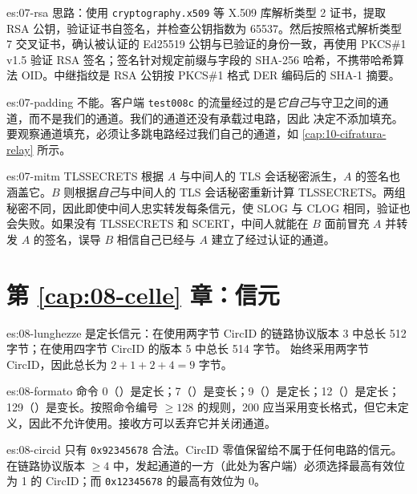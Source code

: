 \begin{soluzione}{es:07-rsa}
思路：使用 \texttt{cryptography.x509} 等 X.509 库解析类型 2 证书，提取 RSA 公钥，验证证书自签名，并检查公钥指数为 65537。然后按照格式解析类型 7 交叉证书，确认被认证的 Ed25519 公钥与已验证的身份一致，再使用 PKCS\#1 v1.5 验证 RSA 签名；签名针对规定前缀与字段的 SHA-256 哈希，不携带哈希算法 OID。中继指纹是 RSA 公钥按 PKCS\#1 格式 DER 编码后的 SHA-1 摘要。
\end{soluzione}

\begin{soluzione}{es:07-padding}
不能。客户端 \texttt{test008c} 的流量经过的是\emph{它自己}与守卫之间的通道，而不是我们的通道。我们的通道还没有承载过电路，因此  决定不添加填充。要观察通道填充，必须让多跳电路经过我们自己的通道，如 \cref{cap:10-cifratura-relay} 所示。
\end{soluzione}

\begin{soluzione}{es:07-mitm}
TLSSECRETS 根据 $A$ 与中间人的 TLS 会话秘密派生，$A$ 的签名也涵盖它。$B$ 则根据\emph{自己}与中间人的 TLS 会话秘密重新计算 TLSSECRETS。两组秘密不同，因此即使中间人忠实转发每条信元，使 SLOG 与 CLOG 相同，验证也会失败。如果没有 TLSSECRETS 和 SCERT，中间人就能在 $B$ 面前冒充 $A$ 并转发 $A$ 的签名，误导 $B$ 相信自己已经与 $A$ 建立了经过认证的通道。
\end{soluzione}

\section*{第 \ref{cap:08-celle} 章：信元}

\begin{soluzione}{es:08-lunghezze}
 是定长信元：在使用两字节 CircID 的链路协议版本 3 中总长 512 字节；在使用四字节 CircID 的版本 5 中总长 514 字节。 始终采用两字节 CircID，因此总长为 $2+1+2+4=9$ 字节。
\end{soluzione}

\begin{soluzione}{es:08-formato}
命令 0（）是定长；7（）是变长；9（）是定长；12（）是定长；129（）是变长。按照命令编号 $\ge 128$ 的规则，200 应当采用变长格式，但它未定义，因此不允许使用。接收方可以丢弃它并关闭通道。
\end{soluzione}

\begin{soluzione}{es:08-circid}
只有 \texttt{0x92345678} 合法。CircID 零值保留给不属于任何电路的信元。在链路协议版本 $\ge 4$ 中，发起通道的一方（此处为客户端）必须选择最高有效位为 1 的 CircID；而 \texttt{0x12345678} 的最高有效位为 0。
\end{soluzione}

